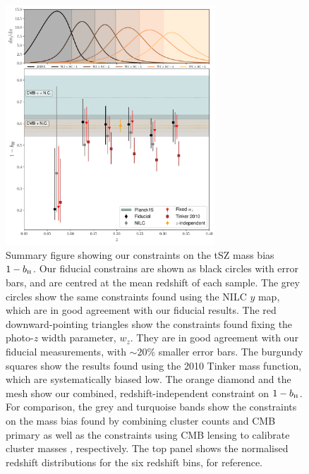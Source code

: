 \documentclass[useAMS,usenatbib]{mn2e}
\def\bH{b_{\scriptscriptstyle\rm H}}
\begin{document}
      \begin{figure}
        \centering
        \includegraphics[width=0.7\textwidth]{bhydro.pdf}
        \caption{Summary figure showing our constraints on the tSZ mass bias $1-\bH$. Our fiducial constrains are shown as black circles with error bars, and are centred at the mean redshift of each sample. The grey circles show the same constraints found using the NILC $y$ map, which are in good agreement with our fiducial results. The red downward-pointing triangles show the constraints found fixing the photo-$z$ width parameter, $w_z$. They are in good agreement with our fiducial measurements, with $\sim20\%$ smaller error bars. The burgundy squares show the results found using the 2010 Tinker mass function, which are systematically biased low. The orange diamond and the mesh show our combined, redshift-independent constraint on $1-\bH$. For comparison, the grey and turquoise bands show the constraints on the mass bias found by combining cluster counts and CMB primary \citep{2016A&A...594A..24P} as well as the constraints using CMB lensing to calibrate cluster masses \citep{2019MNRAS.489..401Z}, respectively. The top panel shows the normalised redshift distributions for the six redshift bins, for reference.}
        \label{fig:bh}
      \end{figure}
\end{document}
